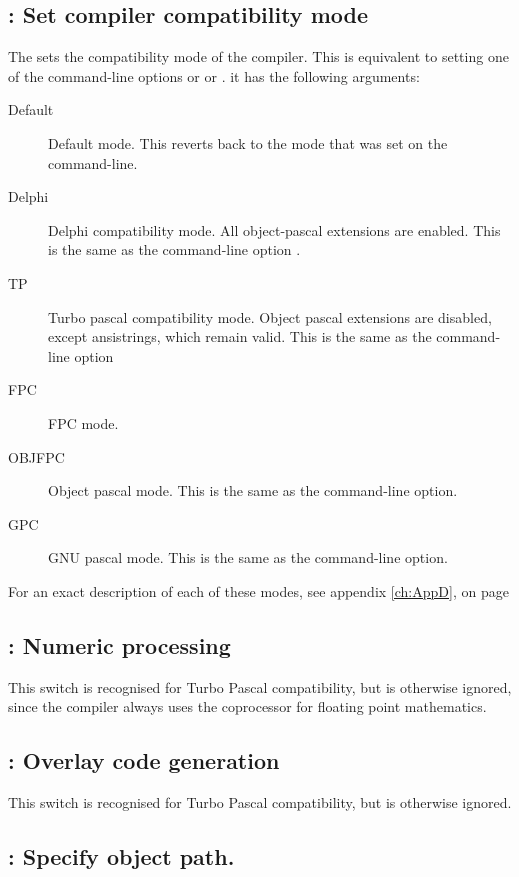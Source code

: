 \documentclass{report}
\begin{document}
\subsection{ : Set compiler compatibility mode}

The  sets the compatibility mode of the compiler. This
is equivalent to setting one of the command-line options  or
 or . it has the following arguments:
\begin{description}
\item[Default] Default mode. This reverts back to the mode that was set on
the command-line.
\item[Delphi] Delphi compatibility mode. All object-pascal extensions are
enabled. This is the same as the command-line option .
\item[TP] Turbo pascal compatibility mode. Object pascal extensions are
disabled, except ansistrings, which remain valid. This is the same as the command-line option 
\item[FPC] FPC mode.
\item[OBJFPC] Object pascal mode. This is the same as the 
command-line option.
\item[GPC] GNU pascal mode. This is the same as the  command-line
option.
\end{description}

For an exact description of each of these modes, see appendix \ref{ch:AppD},
on page \pageref{ch:AppD}

\subsection{ : Numeric processing }

This switch is recognised for Turbo Pascal compatibility, but is otherwise
ignored, since the compiler always uses the coprocessor for floating point
mathematics.

\subsection{ : Overlay code generation }

This switch is recognised for Turbo Pascal compatibility, but is otherwise
ignored.

\subsection{ : Specify object path.}
\end{document}
